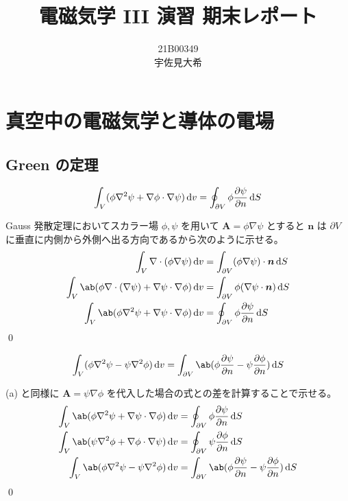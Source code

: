 \documentclass[uplatex,dvipdfmx,a4paper,11pt]{jlreq}
\title{電磁気学 III 演習 期末レポート}
\author{21B00349 \\ 宇佐見大希}
\makeatletter
\newcommand{\laplacian}{\nabla^2}
\theoremstyle{definition}
\renewenvironment{proof}[1][\proofname]{\par
  \normalfont
  \topsep6\p@\@plus6\p@ \trivlist
  \item[\hskip\labelsep{\bfseries #1}\@addpunct{\bfseries}]\ignorespaces\quad\par
}{%
  \qed\endtrivlist\@endpefalse
}
\renewcommand\proofname{証明}
\makeatother
\begin{document}
\maketitle
\tableofcontents
\clearpage

\section{真空中の電磁気学と導体の電場}
\setcounter{subsection}{1}
\subsection{Green の定理}
\begin{problem}
\begin{align}
  \int_V(\phi\laplacian\psi + \nabla\phi\cdot\nabla\psi)\dl{v} = \oint_{\partial V}\phi\diffp{\psi}{n}\dl{S}
\end{align}
\end{problem}
\begin{proof}
  Gauss 発散定理においてスカラー場 $\phi, \psi$ を用いて $\bm{A} = \phi\nabla\psi$ とすると $\bm{n}$ は $\partial V$ に垂直に内側から外側へ出る方向であるから次のように示せる。
  \begin{align}
    \int_V\nabla\cdot(\phi\nabla\psi)\dl{v}                                  & = \int_{\partial V}(\phi\nabla\psi)\cdot\bm{n}\dl{S} \\
    \int_V\ab(\phi\nabla\cdot(\nabla\psi) + \nabla\psi\cdot\nabla\phi)\dl{v} & = \int_{\partial V}\phi(\nabla\psi\cdot\bm{n})\dl{S} \\
    \int_V\ab(\phi\laplacian\psi + \nabla\psi\cdot\nabla\phi)\dl{v}          & = \oint_{\partial V}\phi\diffp{\psi}{n}\dl{S}
  \end{align}
\end{proof}

\begin{problem}
\begin{align}
  \int_V(\phi\laplacian\psi - \psi\laplacian\phi)\dl{v} = \int_{\partial V}\ab(\phi\diffp{\psi}{n} - \psi\diffp{\phi}{n})\dl{S}
\end{align}
\end{problem}
\begin{proof}
  (a) と同様に $\bm{A} = \psi\nabla\phi$ を代入した場合の式との差を計算することで示せる。
  \begin{align}
    \int_V\ab(\phi\laplacian\psi + \nabla\psi\cdot\nabla\phi)\dl{v} & = \oint_{\partial V}\phi\diffp{\psi}{n}\dl{S}                           \\
    \int_V\ab(\psi\laplacian\phi + \nabla\phi\cdot\nabla\psi)\dl{v} & = \oint_{\partial V}\psi\diffp{\phi}{n}\dl{S}                           \\
    \int_V\ab(\phi\laplacian\psi - \psi\laplacian\phi)\dl{v}        & = \int_{\partial V}\ab(\phi\diffp{\psi}{n} - \psi\diffp{\phi}{n})\dl{S}
  \end{align}
\end{proof}
\end{document}
